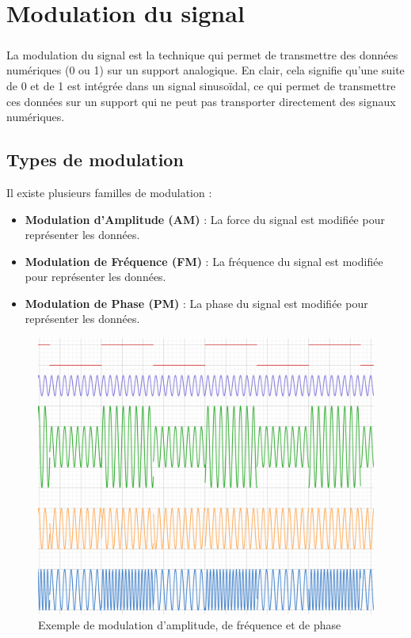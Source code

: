 \documentclass[a4paper,twocolumn]{report}
\begin{document}
\chapter{Modulation du signal}

\paragraph{}La modulation du signal est la technique qui permet de transmettre
des données numériques (0 ou 1) sur un support analogique.
En clair, cela signifie qu'une suite de 0 et de 1 est intégrée dans un signal sinusoïdal,
ce qui permet de transmettre ces données sur un support qui ne peut pas transporter directement des signaux numériques.

\section{Types de modulation}
Il existe plusieurs familles de modulation :
\begin{itemize}
	\item \textbf{Modulation d'Amplitude (AM)} : La force du signal est modifiée pour représenter les données.
	\item \textbf{Modulation de Fréquence (FM)} : La fréquence du signal est modifiée pour représenter les données.
	\item \textbf{Modulation de Phase (PM)} : La phase du signal est modifiée pour représenter les données.
\end{itemize}

\begin{figure}[ht]
	\centering
	\caption{Exemple de modulation d'amplitude, de fréquence et de phase}
	\label{fig:modulation_example}
	\includegraphics[scale=0.25]{images/ModulationExemple.png}
\end{figure}
\end{document}
